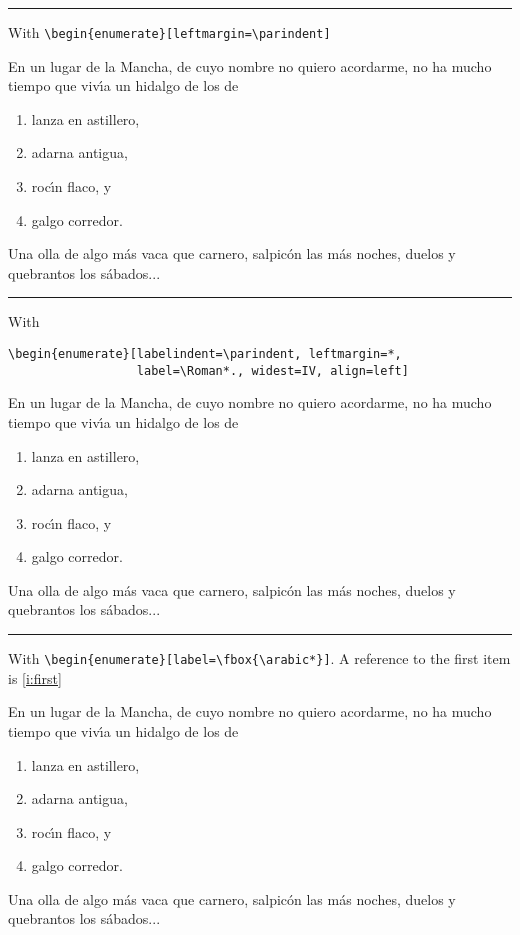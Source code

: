\documentclass{article}
\begin{document}
\vskip6pt
\goodbreak
\hrule
\vskip6pt

With \verb|\begin{enumerate}[leftmargin=\parindent]|

En un lugar de la Mancha, de cuyo nombre no quiero acordarme,
no ha mucho tiempo que viv\'{\i}a un hidalgo de los de
\begin{enumerate}[leftmargin=\parindent]
\item lanza en astillero,
\item adarna antigua,
\item roc\'{\i}n flaco, y
\item galgo corredor.
\end{enumerate}
Una olla de algo m\'{a}s vaca que carnero, salpic\'{o}n las m\'{a}s
noches, duelos y quebrantos los s\'{a}bados...

\vskip6pt
\goodbreak
\hrule
\vskip6pt

With
\begin{verbatim}
\begin{enumerate}[labelindent=\parindent, leftmargin=*,
                  label=\Roman*., widest=IV, align=left]
\end{verbatim}

En un lugar de la Mancha, de cuyo nombre no quiero acordarme,
no ha mucho tiempo que viv\'{\i}a un hidalgo de los de
\begin{enumerate}[labelindent=\parindent, leftmargin=*,
                  label=\Roman*., widest=IV, align=left]
\item lanza en astillero,
\item adarna antigua,
\item roc\'{\i}n flaco, y
\item galgo corredor.
\end{enumerate}
Una olla de algo m\'{a}s vaca que carnero, salpic\'{o}n las m\'{a}s
noches, duelos y quebrantos los s\'{a}bados...

\vskip6pt
\goodbreak
\hrule
\vskip6pt

With \verb|\begin{enumerate}[label=\fbox{\arabic*}]|. A reference to
the first item is \ref{i:first}

En un lugar de la Mancha, de cuyo nombre no quiero acordarme,
no ha mucho tiempo que viv\'{\i}a un hidalgo de los de
\begin{enumerate}[label=\fbox{\arabic*}]
\item \label{i:first}lanza en astillero,
\item adarna antigua,
\item roc\'{\i}n flaco, y
\item galgo corredor.
\end{enumerate}
Una olla de algo m\'{a}s vaca que carnero, salpic\'{o}n las m\'{a}s
noches, duelos y quebrantos los s\'{a}bados...
\end{document}
